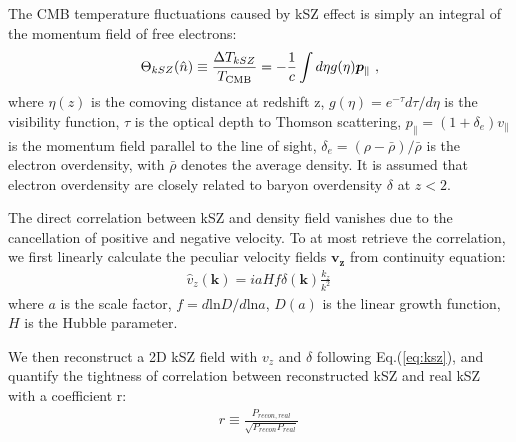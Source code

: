 \label{sec:kszRecon}
The CMB temperature fluctuations caused by kSZ effect is simply an integral of the 
momentum field of free electrons:
\begin{eqnarray}
\label{eq:ksz}
\Theta_{kSZ}(\hat n)\equiv\frac{\Delta T_{kSZ}}{T_{\mathrm{CMB}}}
=-\frac{1}{c}\int d\eta  g(\eta)  \bm{p}_\parallel\ ,
\end{eqnarray}
where $\eta(z)$ is the comoving distance at redshift z, $g(\eta)=e^{-\tau} d\tau/d\eta$ is the visibility function, $\tau$ is the optical depth to Thomson scattering, 
$p_\parallel=(1+\delta_e)v_\parallel$ 
is the momentum field parallel to the line of sight, 
$\delta_e=(\rho-\bar{\rho})/\bar{\rho}$ 
is the electron overdensity, 
with $\bar\rho$ denotes the average density. 
It is assumed that electron overdensity are closely 
related to baryon overdensity $\delta$ at $z<2$. 

The direct correlation between kSZ and density field vanishes due to the cancellation of positive and negative velocity.
To at most retrieve the correlation,  
we first linearly calculate the peculiar velocity fields $\bm{v_z}$ 
from continuity equation:
\begin{eqnarray}
	\label{eq:v}
\hat v_z(\bm{k})=i a H f\delta(\bm{k})\frac{k_z}{k^2}\,
\end{eqnarray}
where $a$ is the scale factor, $f=d\mathrm{ln}D/d\mathrm{ln}a$, $D(a)$ is the linear growth function, 
$H$ is the Hubble parameter.

We then reconstruct a 2D kSZ field with $v_z$ and $\delta$ 
following Eq.(\ref{eq:ksz}), 
and quantify the tightness of correlation between reconstructed kSZ and real kSZ 
with a coefficient r: 
\begin{eqnarray}
	r\equiv \frac{P_{recon,real}}{\sqrt{P_{recon}P_{real}}}\,
\end{eqnarray}

